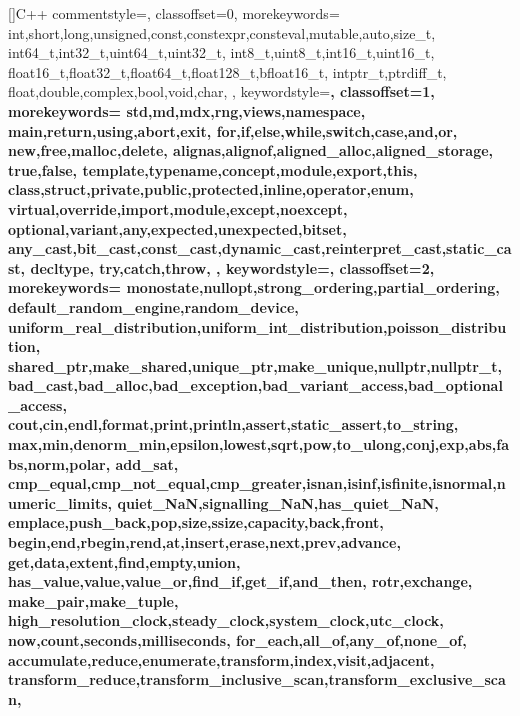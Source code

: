 \newcommand\lstcpp{cpp}
[]{C++}{
  commentstyle=\rmfamily\color{gray},
  classoffset=0,
  morekeywords={
    int,short,long,unsigned,const,constexpr,consteval,mutable,auto,size_t,
    int64_t,int32_t,uint64_t,uint32_t,
    int8_t,uint8_t,int16_t,uint16_t,
    float16_t,float32_t,float64_t,float128_t,bfloat16_t,
    intptr_t,ptrdiff_t,
    float,double,complex,bool,void,char,
  },
  keywordstyle=\bfseries\color{indianred},
  classoffset=1,
  morekeywords={
    std,md,mdx,rng,views,namespace,
    main,return,using,abort,exit,
    for,if,else,while,switch,case,and,or,
    new,free,malloc,delete,
    alignas,alignof,aligned_alloc,aligned_storage,
    true,false,
    template,typename,concept,module,export,this,
    class,struct,private,public,protected,inline,operator,enum,
    virtual,override,import,module,except,noexcept,
    optional,variant,any,expected,unexpected,bitset,
    any_cast,bit_cast,const_cast,dynamic_cast,reinterpret_cast,static_cast,
    decltype,
    try,catch,throw,
  },
  keywordstyle=\bfseries\color{airforceblue}, %
  classoffset=2,
  morekeywords={
    monostate,nullopt,strong_ordering,partial_ordering,
    default_random_engine,random_device,
    uniform_real_distribution,uniform_int_distribution,poisson_distribution,
    shared_ptr,make_shared,unique_ptr,make_unique,nullptr,nullptr_t,
    bad_cast,bad_alloc,bad_exception,bad_variant_access,bad_optional_access,
    cout,cin,endl,format,print,println,assert,static_assert,to_string,
    max,min,denorm_min,epsilon,lowest,sqrt,pow,to_ulong,conj,exp,abs,fabs,norm,polar,
    add_sat,
    cmp_equal,cmp_not_equal,cmp_greater,isnan,isinf,isfinite,isnormal,numeric_limits,
    quiet_NaN,signalling_NaN,has_quiet_NaN,
    emplace,push_back,pop,size,ssize,capacity,back,front,
    begin,end,rbegin,rend,at,insert,erase,next,prev,advance,
    get,data,extent,find,empty,union,
    has_value,value,value_or,find_if,get_if,and_then,
    rotr,exchange,
    make_pair,make_tuple,
    high_resolution_clock,steady_clock,system_clock,utc_clock,
    now,count,seconds,milliseconds,
    for_each,all_of,any_of,none_of,
    accumulate,reduce,enumerate,transform,index,visit,adjacent,
    transform_reduce,transform_inclusive_scan,transform_exclusive_scan,
}}
